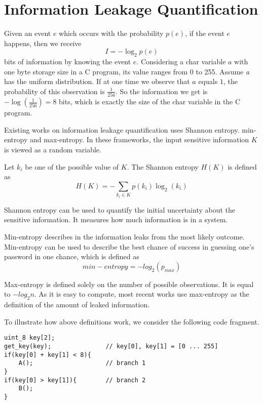 
\section{Information Leakage Quantification}
 
Given an event $e$ which occurs with the probability $p(e)$, if the event $e$ happens, 
then we receive
\begin{displaymath}
    I = - \log_2p(e)
\end{displaymath}
bits of information by knowing the event $e$.
Considering a char variable $a$ with one byte storage size in a C program, its value 
ranges from 0 to 255.  Assume
 \textit{a} has the uniform distribution. If at one time we observe that $a$
equals $1$, the probability of this observation is $\frac{1}{256}$. So the information we get is 
$-\log(\frac{1}{256}) = 8$ bits, which is exactly the size of the char variable in the C program.

Existing works on information leakage quantification uses Shannon entropy.
min-entropy \cite{10.1007/978-3-642-00596-1_21} and max-entropy.
In these frameworks, the input sensitive
information $K$ is viewed as a random variable. 

Let $k_i$ be one of the possible
value of $K$. The Shannon entropy $H(K)$ is defined as
\begin{displaymath}
    H(K) = - \sum_{k_i {\in} K}p(k_i)\log_2(k_i)
\end{displaymath}

Shannon entropy can be used to quantify the initial uncertainty about the sensitive
information. It measures how much information is in a system.

Min-entropy describes in the information leaks from the most likely outcome.
Min-entropy can be used to describe the best chance of success in guessing 
one's password in one chance, which is defined as 
\begin{displaymath}
    min-entropy = - log_2(p_{max})
\end{displaymath}

Max-entropy is defined solely on the number of possible observations. It is 
equal to $-log_2{n}$. As it is easy to compute, most recent works use 
max-entropy as the definition of the amount of leaked information.

To illustrate how above definitions work, we consider the following
code fragment. 

\begin{lstlisting}[xleftmargin=.03\textwidth,xrightmargin=.01\textwidth]
uint_8 key[2]; 
get_key(key);               // key[0], key[1] = [0 ... 255]
if(key[0] + key[1] < 8){
    A();                    // branch 1
}
if(key[0] > key[1]){        // branch 2
    B();
}
\end{lstlisting}

